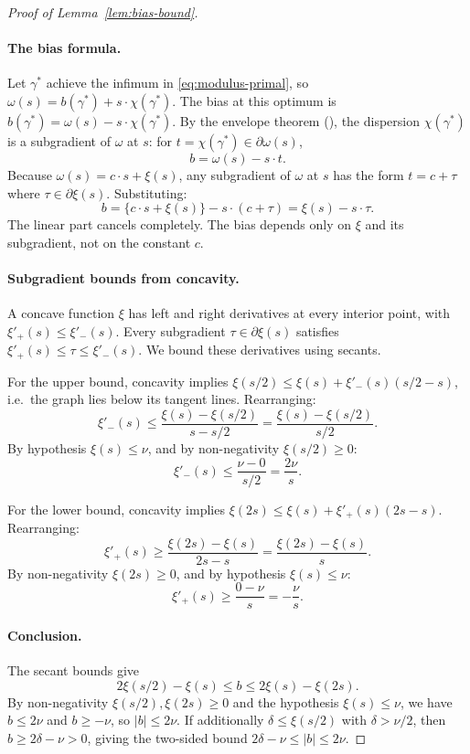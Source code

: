 \documentclass{article}
\begin{document}
\begin{proof}[Proof of Lemma~\ref{lem:bias-bound}]
\paragraph{The bias formula.} Let $\gamma^*$ achieve the infimum in \eqref{eq:modulus-primal}, so $\omega(s) = b(\gamma^*) + s \cdot \chi(\gamma^*)$. The bias at this optimum is $b(\gamma^*) = \omega(s) - s \cdot \chi(\gamma^*)$. By the envelope theorem (), the dispersion $\chi(\gamma^*)$ is a subgradient of $\omega$ at $s$: for $t = \chi(\gamma^*) \in \partial\omega(s)$,
\[
b = \omega(s) - s \cdot t.
\]
Because $\omega(s) = c \cdot s + \xi(s)$, any subgradient of $\omega$ at $s$ has the form $t = c + \tau$ where $\tau \in \partial\xi(s)$. Substituting:
\[
b = \{c \cdot s + \xi(s)\} - s \cdot (c + \tau) = \xi(s) - s \cdot \tau.
\]
The linear part cancels completely. The bias depends only on $\xi$ and its subgradient, not on the constant $c$.

\paragraph{Subgradient bounds from concavity.} A concave function $\xi$ has left and right derivatives at every interior point, with $\xi'_+(s) \le \xi'_-(s)$. Every subgradient $\tau \in \partial\xi(s)$ satisfies $\xi'_+(s) \le \tau \le \xi'_-(s)$. We bound these derivatives using secants.

For the upper bound, concavity implies $\xi(s/2) \le \xi(s) + \xi'_-(s)(s/2 - s)$, i.e.\ the graph lies below its tangent lines. Rearranging:
\[
\xi'_-(s) \le \frac{\xi(s) - \xi(s/2)}{s - s/2} = \frac{\xi(s) - \xi(s/2)}{s/2}.
\]
By hypothesis $\xi(s) \le \nu$, and by non-negativity $\xi(s/2) \ge 0$:
\[
\xi'_-(s) \le \frac{\nu - 0}{s/2} = \frac{2\nu}{s}.
\]

For the lower bound, concavity implies $\xi(2s) \le \xi(s) + \xi'_+(s)(2s - s)$. Rearranging:
\[
\xi'_+(s) \ge \frac{\xi(2s) - \xi(s)}{2s - s} = \frac{\xi(2s) - \xi(s)}{s}.
\]
By non-negativity $\xi(2s) \ge 0$, and by hypothesis $\xi(s) \le \nu$:
\[
\xi'_+(s) \ge \frac{0 - \nu}{s} = -\frac{\nu}{s}.
\]

\paragraph{Conclusion.} The secant bounds give
\[
2\xi(s/2) - \xi(s) \le b \le 2\xi(s) - \xi(2s).
\]
By non-negativity $\xi(s/2), \xi(2s) \ge 0$ and the hypothesis $\xi(s) \le \nu$, we have $b \le 2\nu$ and $b \ge -\nu$, so $|b| \le 2\nu$. If additionally $\delta \le \xi(s/2)$ with $\delta > \nu/2$, then $b \ge 2\delta - \nu > 0$, giving the two-sided bound $2\delta - \nu \le |b| \le 2\nu$.
\end{proof}
\end{document}
